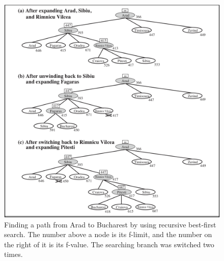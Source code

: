 \begin{figure}[ht]
    \centering
    \includegraphics[width=\linewidth]{fig/rbfs.png}
    \caption{Finding a path from Arad to Bucharest by using recursive best-first search. The number above a node is its f-limit, and the number on the right of it is its f-value. The searching branch was switched two times. \cite{aima2020}} 
    \label{fig:rbfs}
\end{figure}


